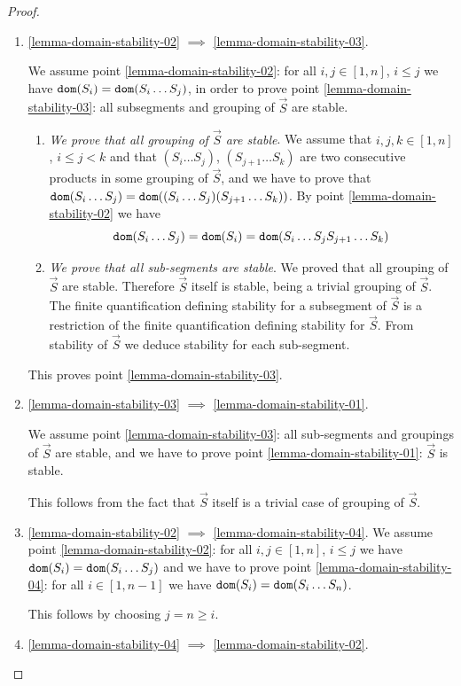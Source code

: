 \documentclass{lmcs}
\begin{document}
\begin{proof}
\begin{enumerate}
\item
\ref{lemma-domain-stability-02} $\implies$ \ref{lemma-domain-stability-03}.

We assume point \ref{lemma-domain-stability-02}: 
for all $i, j \in [1, n]$, $i \le j$ we have ${\tt dom}(S_i)  =  {\tt dom}(S_i \ldots S_j)$,
in order to prove point \ref{lemma-domain-stability-03}:
all subsegments and grouping of $\vec{S}$ are stable. 
\begin{enumerate}
\item
\emph{We prove that all grouping of $\vec{S}$ are stable}. We assume that
$i, j,k\in [1, n]$, $i \le j < k$ and that $(S_i \ldots S_j)$, $(S_{j+1} \ldots S_k)$
are two consecutive products in some grouping of $\vec{S}$, and we have to prove 
that ${\tt dom}(S_i \ldots S_j) = {\tt dom}( (S_i \ldots S_j) (S_{j+1} \ldots S_k))$. 
By point \ref{lemma-domain-stability-02} we have 
$$
{\tt dom}(S_i \ldots S_j) = {\tt dom}(S_i) = {\tt dom}(S_i \ldots S_j S_{j+1} \ldots S_k)
$$
\item
\emph{We prove that all sub-segments are stable}. 
We proved that all grouping of $\vec{S}$ are stable.
Therefore $\vec{S}$ itself is stable, being a trivial grouping of $\vec{S}$.
The finite quantification defining stability for a subsegment of $\vec{S}$ 
is a restriction of the finite quantification defining stability for $\vec{S}$. From
stability of $\vec{S}$ we deduce stability for each sub-segment.
\end{enumerate}
This proves point \ref{lemma-domain-stability-03}.


\item
\ref{lemma-domain-stability-03} $\implies$ \ref{lemma-domain-stability-01}.

We assume point \ref{lemma-domain-stability-03}: all sub-segments 
and groupings of $\vec{S}$ are stable,
and we have to prove point \ref{lemma-domain-stability-01}: $\vec{S}$ is stable. 

This follows from the fact that $\vec{S}$ itself is a trivial case of grouping of $\vec{S}$.


\item
\ref{lemma-domain-stability-02} $\implies$  \ref{lemma-domain-stability-04}.
We assume point \ref{lemma-domain-stability-02}:
for all $i, j \in [1, n]$, $i \le j$ we have ${\tt dom}(S_i) =  {\tt dom}(S_i \ldots S_j)$
and we have to prove point \ref{lemma-domain-stability-04}: 
for all $i \in [1, n-1]$ we have ${\tt dom}(S_i) =  {\tt dom}(S_i \ldots S_n)$.

This follows by choosing $j=n \ge i$.


\item
\ref{lemma-domain-stability-04} $\implies$  \ref{lemma-domain-stability-02}.


\end{enumerate}
\end{proof}
\end{document}
